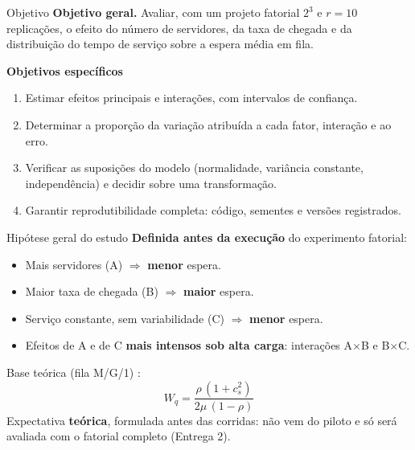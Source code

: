 \documentclass[aspectratio=169,11pt]{beamer}
\newcommand{\Wq}{W_q}
\newcommand{\destaque}[1]{{\color{azul}\bfseries #1}}
\begin{document}
\begin{frame}{Objetivo}
  \destaque{Objetivo geral.} Avaliar, com um projeto fatorial $2^3$ e $r = 10$ replicações, o efeito do número de servidores, da taxa de chegada e da distribuição do tempo de serviço sobre a espera média em fila.

  \vspace{8pt}
  \destaque{Objetivos específicos}
  \begin{enumerate}
    \setlength{\itemsep}{4pt}
    \item Estimar efeitos principais e interações, com intervalos de confiança.
    \item Determinar a proporção da variação atribuída a cada fator, interação e ao erro.
    \item Verificar as suposições do modelo (normalidade, variância constante, independência) e decidir sobre uma transformação.
    \item Garantir reprodutibilidade completa: código, sementes e versões registrados.
  \end{enumerate}
\end{frame}

\begin{frame}{Hipótese geral do estudo}
  \destaque{Definida antes da execução} do experimento fatorial:
  \begin{itemize}
    \setlength{\itemsep}{4pt}
    \item Mais servidores (A) $\Rightarrow$ \destaque{menor} espera.
    \item Maior taxa de chegada (B) $\Rightarrow$ \destaque{maior} espera.
    \item Serviço constante, sem variabilidade (C) $\Rightarrow$ \destaque{menor} espera.
    \item Efeitos de A e de C \destaque{mais intensos sob alta carga}: interações A$\times$B e B$\times$C.
  \end{itemize}
  \vspace{6pt}
  Base teórica (fila M/G/1) \parencite{jain1991}:
  \[
    \Wq = \frac{\rho\,(1 + c_s^2)}{2\mu\,(1-\rho)}
  \]
  \vspace{-4pt}
  Expectativa \destaque{teórica}, formulada antes das corridas: não vem do piloto e só será avaliada com o fatorial completo (Entrega 2).
\end{frame}
\end{document}
